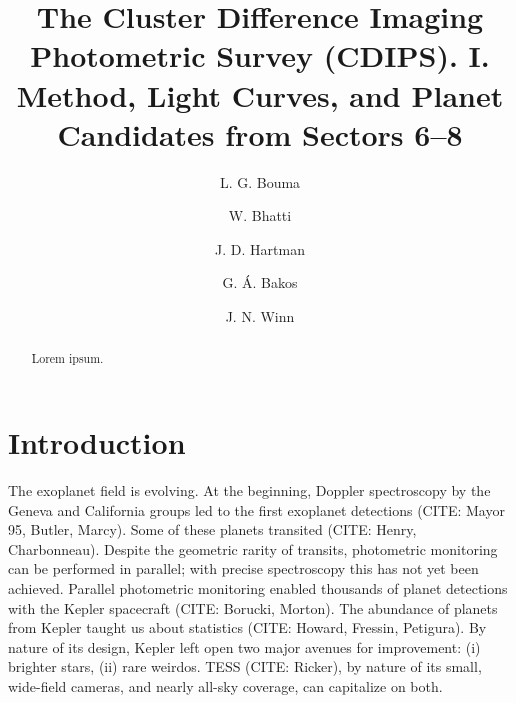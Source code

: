 \documentclass[12pt,twocolumn,tighten]{aastex62}
\begin{document}
\title{
  The Cluster Difference Imaging Photometric Survey (CDIPS).
  I. Method, Light Curves, and Planet Candidates from Sectors 6--8
}


\author[0000-0002-0514-5538]{L. G. Bouma}
%
\author[0000-0002-0628-0088]{W. Bhatti}
%
\author[0000-0001-8732-6166]{J. D. Hartman}
%
\author[0000-0001-7204-6727]{G. \'A. Bakos}
%
\author[0000-0002-4265-047X]{J. N. Winn}

\begin{abstract}
  Lorem ipsum.
\end{abstract}



\section{Introduction}
\label{sec:intro}

The exoplanet field is evolving.
At the beginning, Doppler spectroscopy by the Geneva and California groups
led to the first exoplanet detections (CITE: Mayor 95, Butler, Marcy).
Some of these planets transited (CITE: Henry, Charbonneau).
Despite the geometric rarity of transits, photometric monitoring can
be performed in parallel; with precise spectroscopy this has not
yet been achieved.
Parallel photometric monitoring enabled thousands of planet detections
with the Kepler spacecraft (CITE: Borucki, Morton).
The abundance of planets from Kepler taught us about statistics
(CITE: Howard, Fressin, Petigura).
By nature of its design, Kepler left open two major avenues for
improvement: (i) brighter stars, (ii) rare weirdos.
TESS (CITE: Ricker), by nature of its small, wide-field cameras, and
nearly all-sky coverage, can capitalize on both.
\end{document}
